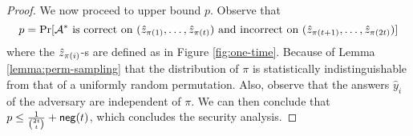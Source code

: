 \begin{proof}
We now proceed to upper bound $p$. Observe that 
\[ 
p = \Pr[\mathcal{A}^* \text{ is correct on } (\hat{z}_{\pi(1)},\dots,\hat{z}_{\pi(t)}) \text{ and incorrect on } (\hat{z}_{\pi(t+1)},\dots,\hat{z}_{\pi(2t)})] 
\]
where the $\hat{z}_{\pi(i)}$-s are defined as in Figure \ref{fig:one-time}.
Because of Lemma \ref{lemma:perm-sampling} that the distribution of $\pi$ is statistically indistinguishable from that of a uniformly random permutation. Also, observe that the answers $\hat{y}_i$ of the adversary are independent of $\pi$.
We can then conclude that $p \leq \frac{1}{\binom{2t} {t}} + \mathsf{neg}(t)$, which concludes the security analysis. 
\end{proof}